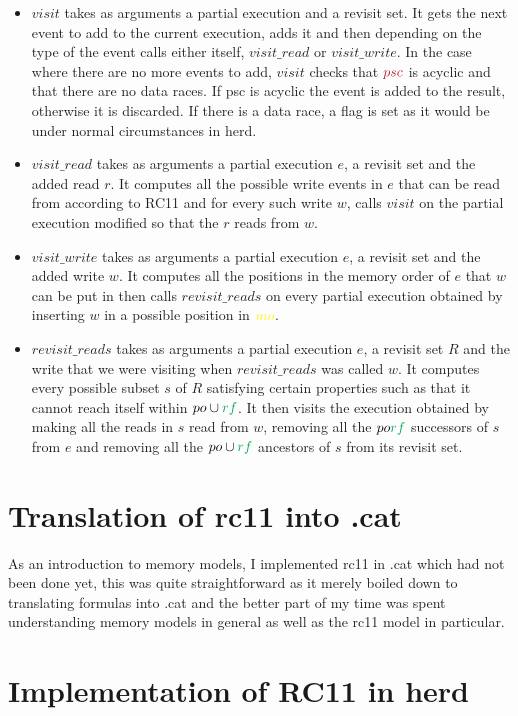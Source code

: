 \documentclass[a4,12pt]{article}
\newcommand{\mo}{{\color{Yellow}mo}}
\newcommand{\psc}{{\color{Maroon}psc}}
\newcommand{\po}{po}
\newcommand{\rf}{{\color{Green}rf}}
\begin{document}
\begin{itemize}
\item $visit$ takes as arguments a partial execution and a revisit set. It gets the next event to add to the current execution, adds it and then depending on the type of the event calls either itself, $visit\_read$ or $visit\_write$. In the case where there are no more events to add, $visit$ checks that $\psc$ is acyclic and that there are no data races. If psc is acyclic the event is added to the result, otherwise it is discarded. If there is a data race, a flag is set as it would be under normal circumstances in herd.
\item $visit\_read$ takes as arguments a partial execution $e$, a revisit set and the added read $r$. It computes all the possible write events in $e$ that can be read from according to RC11 and for every such write $w$, calls $visit$ on the partial execution modified so that the $r$ reads from $w$.
\item $visit\_write$ takes as arguments a partial execution $e$, a revisit set and the added write $w$. It computes all the positions in the memory order of $e$ that $w$ can be put in then calls $revisit\_reads$ on every partial execution obtained by inserting $w$ in a possible position in $\mo$.
\item $revisit\_reads$ takes as arguments a partial execution $e$, a revisit set $R$ and the write that we were visiting when $revisit\_reads$ was called $w$. It computes every possible subset $s$ of $R$ satisfying certain properties such as that it cannot reach itself within $\po\cup\rf$. It then visits the execution obtained by making all the reads in $s$ read from $w$, removing all the $\po \rf$ successors of $s$ from $e$ and removing all the $\po\cup\rf$ ancestors of $s$ from its revisit set.
\end{itemize}

\section{Translation of rc11 into .cat}

As an introduction to memory models, I implemented rc11 in .cat which had not been done yet, this was quite straightforward as it merely boiled down to translating formulas into .cat and the better part of my time was spent understanding memory models in general as well as the rc11 model in particular.

\section{Implementation of RC11 in herd}
\end{document}
